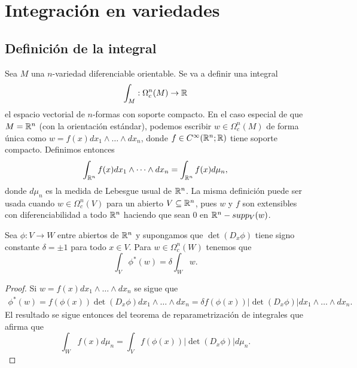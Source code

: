 \documentclass[CV.tex]{subfiles}
\begin{document}

\chapter{Integración en variedades}




\section{Definición de la integral}

Sea $M$ una $n$-variedad diferenciable orientable. Se va a definir una integral
\[
\int_M:\Omega_c^n(M)\to\mathbb{R}
\]
el espacio vectorial de $n$-formas con soporte compacto. En el caso especial de que $M=\mathbb{R}^n$ (con la orientación estándar), podemos escribir $w\in\Omega_c^n(M)$ de forma única como $w=f(x)dx_1\land\dots\land dx_n$, donde $f\in C^{\infty}(\mathbb{R}^n;\mathbb{R})$ tiene soporte compacto. Definimos entonces
\[
\int_{\mathbb{R}^n}f(x)dx_1\land\dots\land dx_n=\int_{\mathbb{R}^n} f(x)d\mu_n,
\]
donde $d\mu_n$ es la medida de Lebesgue usual de $\mathbb{R}^n$. La misma definición puede ser usada cuando $w\in\Omega_c^n(V)$ para un abierto $V\subseteq\mathbb{R}^n$, pues $w$ y $f$ son extensibles con diferenciabilidad a todo $\mathbb{R}^n$ haciendo que sean 0 en $\mathbb{R}^n-supp_V(w)$. 

\begin{lemma}
Sea $\phi:V\to W$ entre abiertos de $\mathbb{R}^n$ y supongamos que $\det(D_x\phi)$ tiene signo constante $\delta=\pm 1$ para todo $x\in V$. Para $w\in\Omega_c^n(W)$ tenemos que
\[
\int_V\phi^*(w)=\delta\int_Ww.
\]
\end{lemma}
\begin{proof}
Si $w=f(x)dx_1\land\dots\land dx_n$ se sigue que
\begin{align*}
\phi^*(w)=f(\phi(x))\det(D_x\phi)dx_1\land\dots\land dx_n=\delta f(\phi(x))|\det(D_x\phi)|dx_1\land\dots\land dx_n.
\end{align*}
El resultado se sigue entonces del teorema de reparametrización de integrales que afirma que
\[
\int_W f(x)d\mu_n=\int_V f(\phi(x))|\det(D_x\phi)|d\mu_n.
\]
\end{proof}
\end{document}
